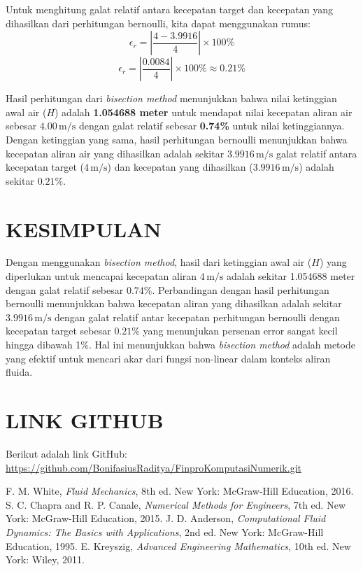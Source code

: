 \documentclass[conference]{IEEEtran}
\begin{document}
Untuk menghitung galat relatif antara kecepatan target dan kecepatan yang dihasilkan dari perhitungan bernoulli, kita dapat menggunakan rumus:
\begin{equation}
\epsilon_r = \left| \frac{4 - 3.9916}{4} \right| \times 100\%
\end{equation}
\begin{equation}
\epsilon_r = \left| \frac{0.0084}{4} \right| \times 100\% \approx 0.21\%
\end{equation}

Hasil perhitungan dari \textit{bisection method} menunjukkan bahwa nilai ketinggian awal air ($H$) adalah \textbf{1.054688 meter} untuk mendapat nilai kecepatan aliran air sebesar $4.00 \, \text{m/s}$ dengan galat relatif sebesar \textbf{0.74\%} untuk nilai ketinggiannya. Dengan ketinggian yang sama, hasil perhitungan bernoulli menunjukkan bahwa kecepatan aliran air yang dihasilkan adalah sekitar $3.9916 \, \text{m/s}$ galat relatif antara kecepatan target ($4 \, \text{m/s}$) dan kecepatan yang dihasilkan ($3.9916 \, \text{m/s}$) adalah sekitar $0.21\%$. \\

\section{KESIMPULAN}
Dengan menggunakan \textit{bisection method}, hasil dari ketinggian awal air ($H$) yang diperlukan untuk mencapai kecepatan aliran $4 \, \text{m/s}$ adalah sekitar 1.054688 meter dengan galat relatif sebesar $0.74\%$. Perbandingan dengan hasil perhitungan bernoulli menunjukkan bahwa kecepatan aliran yang dihasilkan adalah sekitar $3.9916 \, \text{m/s}$ dengan galat relatif antar kecepatan perhitungan bernoulli dengan kecepatan target sebesar $0.21\%$ yang menunjukan persenan error sangat kecil hingga dibawah 1\%. Hal ini menunjukkan bahwa \textit{bisection method} adalah metode yang efektif untuk mencari akar dari fungsi non-linear dalam konteks aliran fluida. \\

\section{LINK GITHUB}
Berikut adalah link GitHub:
\url{https://github.com/BonifasiusRaditya/FinproKomputasiNumerik.git} \\

\begin{thebibliography}{00}
 F. M. White, \textit{Fluid Mechanics}, 8th ed. New York: McGraw-Hill Education, 2016.
 S. C. Chapra and R. P. Canale, \textit{Numerical Methods for Engineers}, 7th ed. New York: McGraw-Hill Education, 2015.
 J. D. Anderson, \textit{Computational Fluid Dynamics: The Basics with Applications}, 2nd ed. New York: McGraw-Hill Education, 1995.
 E. Kreyszig, \textit{Advanced Engineering Mathematics}, 10th ed. New York: Wiley, 2011.
\end{thebibliography}
\vspace{12pt}
\end{document}
